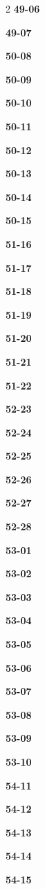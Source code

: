 \documentclass[10pt,a4paper]{article}
\begin{document}
\begin{multicols}{2}
\noindent\textbf{49-06}\ \par
\noindent\textbf{49-07}\ \par
\noindent\textbf{50-08}\ \par
\noindent\textbf{50-09}\ \par
\noindent\textbf{50-10}\ \par
\noindent\textbf{50-11}\ \par
\noindent\textbf{50-12}\ \par
\noindent\textbf{50-13}\ \par
\noindent\textbf{50-14}\ \par
\noindent\textbf{50-15}\ \par
\noindent\textbf{51-16}\ \par
\noindent\textbf{51-17}\ \par
\noindent\textbf{51-18}\ \par
\noindent\textbf{51-19}\ \par
\noindent\textbf{51-20}\ \par
\noindent\textbf{51-21}\ \par
\noindent\textbf{51-22}\ \par
\noindent\textbf{52-23}\ \par
\noindent\textbf{52-24}\ \par
\noindent\textbf{52-25}\ \par
\noindent\textbf{52-26}\ \par
\noindent\textbf{52-27}\ \par
\noindent\textbf{52-28}\ \par
\noindent\textbf{53-01}\ \par
\noindent\textbf{53-02}\ \par
\noindent\textbf{53-03}\ \par
\noindent\textbf{53-04}\ \par
\noindent\textbf{53-05}\ \par
\noindent\textbf{53-06}\ \par
\noindent\textbf{53-07}\ \par
\noindent\textbf{53-08}\ \par
\noindent\textbf{53-09}\ \par
\noindent\textbf{53-10}\ \par
\noindent\textbf{54-11}\ \par
\noindent\textbf{54-12}\ \par
\noindent\textbf{54-13}\ \par
\noindent\textbf{54-14}\ \par
\noindent\textbf{54-15}\ \par

\end{multicols}
\end{document}
